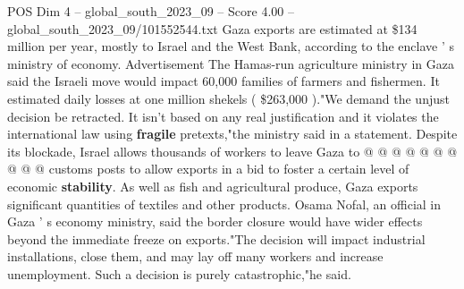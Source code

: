 \begin{textsample}{POS Dim 4 – global\_south\_2023\_09 – Score 4.00 – global\_south\_2023\_09/101552544.txt}
Gaza exports are estimated at \$134 million per year, mostly to Israel and the West Bank, according to the enclave ' s ministry of economy.
Advertisement The Hamas-run agriculture ministry in Gaza said the Israeli move would impact 60,000 families of farmers and fishermen.
It estimated daily losses at one million shekels ( \$263,000 )."We demand the unjust decision be retracted.
It isn't based on any real justification and it violates the international law using \textbf{fragile} pretexts,"the ministry said in a statement.
Despite its blockade, Israel allows thousands of workers to leave Gaza to @ @ @ @ @ @ @ @ @ @ customs posts to allow exports in a bid to foster a certain level of economic \textbf{stability}.
As well as fish and agricultural produce, Gaza exports significant quantities of textiles and other products.
Osama Nofal, an official in Gaza ' s economy ministry, said the border closure would have wider effects beyond the immediate freeze on exports."The decision will impact industrial installations, close them, and may lay off many workers and increase unemployment.
Such a decision is purely catastrophic,"he said.

\end{textsample}
